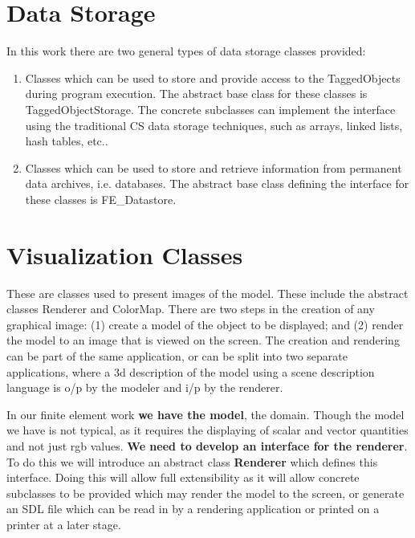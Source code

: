 \pagebreak 





\section{Data Storage} 
In this work there are two general types of data storage classes provided: 
\begin{enumerate}
\item Classes which can be used to store and provide access to the TaggedObjects
during program execution. The abstract base class for these classes is
TaggedObjectStorage. The concrete subclasses can implement the
interface using the traditional CS data storage techniques, such as
arrays, linked lists, hash tables, etc..
\item Classes which can be used to store and retrieve information from
permanent data archives, i.e. databases. The abstract base class
defining the interface for these classes is FE\_Datastore.
\end{enumerate}

\pagebreak 
\pagebreak

\section {Visualization Classes} 
These are classes used to present images
of the model. These include the abstract classes Renderer and ColorMap.
There are two steps in the creation of any graphical image: (1) create
a model of the object to be displayed; and (2) render the model to an image
that is viewed on the screen. The creation and rendering can be part
of the same application, or can be split into two separate
applications, where a 3d description of the model using a scene
description language is o/p by the modeler and i/p by the renderer.  

In our finite element work {\bf we have the model}, the domain. Though
the model we have is not typical, as it requires the displaying of scalar and
vector quantities and not just rgb values. {\bf We need to develop an
interface for the renderer}. To do this we will introduce an abstract
class {\bf Renderer} which defines this interface. Doing this will
allow full extensibility as it will allow concrete subclasses to be
provided which may render the model to the screen, or generate an SDL
file which can be read in by a rendering application or printed on a
printer at a later stage.

